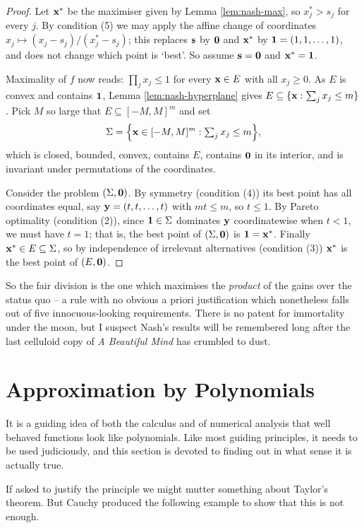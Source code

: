 \documentclass[a4paper]{scrartcl}
\begin{document}
\begin{proof}
	Let $\mathbf{x}^*$ be the maximiser given by Lemma \ref{lem:nash-max}, so $x^*_j > s_j$ for every $j$. By condition (5) we may apply the affine change of coordinates $x_j \mapsto (x_j - s_j)/(x_j^*-s_j)$; this replaces $\mathbf{s}$ by $\mathbf{0}$ and $\mathbf{x}^*$ by $\mathbf{1}=(1,1,\ldots,1)$, and does not change which point is `best'. So assume $\mathbf{s} = \mathbf{0}$ and $\mathbf{x}^*=\mathbf{1}$.

	Maximality of $f$ now reads: $\prod_j x_j \leq 1$ for every $\mathbf{x} \in E$ with all $x_j \geq 0$. As $E$ is convex and contains $\mathbf{1}$, Lemma \ref{lem:nash-hyperplane} gives $E \subseteq \{\mathbf{x} : \sum_j x_j \leq m\}$. Pick $M$ so large that $E \subseteq [-M,M]^m$ and set
	$$\Sigma = \Big\{\mathbf{x} \in [-M,M]^m : \textstyle\sum_j x_j \leq m\Big\},$$
	which is closed, bounded, convex, contains $E$, contains $\mathbf{0}$ in its interior, and is invariant under permutations of the coordinates.

	Consider the problem $(\Sigma,\mathbf{0})$. By symmetry (condition (4)) its best point has all coordinates equal, say $\mathbf{y} = (t,t,\ldots,t)$ with $mt\leq m$, so $t\leq 1$. By Pareto optimality (condition (2)), since $\mathbf{1}\in\Sigma$ dominates $\mathbf{y}$ coordinatewise when $t<1$, we must have $t=1$; that is, the best point of $(\Sigma,\mathbf{0})$ is $\mathbf{1} = \mathbf{x}^*$. Finally $\mathbf{x}^*\in E \subseteq \Sigma$, so by independence of irrelevant alternatives (condition (3)) $\mathbf{x}^*$ is the best point of $(E,\mathbf{0})$.
\end{proof}

So the fair division is the one which maximises the \emph{product} of the gains over the status quo -- a rule with no obvious a priori justification which nonetheless falls out of five innocuous-looking requirements. There is no patent for immortality under the moon, but I suspect Nash's results will be remembered long after the last celluloid copy of \emph{A Beautiful Mind} has crumbled to dust.

\section{Approximation by Polynomials}

It is a guiding idea of both the calculus and of numerical analysis that well behaved functions look like polynomials. Like most guiding principles, it needs to be used judiciously, and this section is devoted to finding out in what sense it is actually true.

If asked to justify the principle we might mutter something about Taylor's theorem. But Cauchy produced the following example to show that this is not enough.
\end{document}
